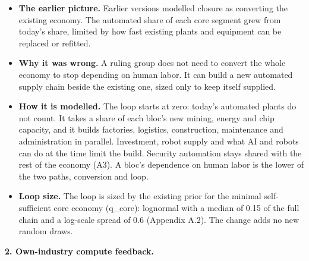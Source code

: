 \documentclass[
  10pt,
]{article}
\providecommand{\tightlist}{%
  \setlength{\itemsep}{0pt}\setlength{\parskip}{0pt}}
\begin{document}
\begin{itemize}
\tightlist
\item
  \textbf{The earlier picture.} Earlier versions modelled closure as converting the existing
  economy. The automated share of each core segment grew from today's share, limited by how fast
  existing plants and equipment can be replaced or refitted.
\item
  \textbf{Why it was wrong.} A ruling group does not need to convert the whole economy to stop
  depending on human labor. It can build a new automated supply chain beside the existing one, sized
  only to keep itself supplied.
\item
  \textbf{How it is modelled.} The loop starts at zero: today's automated plants do not count. It
  takes a share of each bloc's new mining, energy and chip capacity, and it builds factories,
  logistics, construction, maintenance and administration in parallel. Investment, robot supply and
  what AI and robots can do at the time limit the build. Security automation stays shared with the
  rest of the economy (A3). A bloc's dependence on human labor is the lower of the two paths,
  conversion and loop.
\item
  \textbf{Loop size.} The loop is sized by the existing prior for the minimal self-sufficient core
  economy (q\_core): lognormal with a median of 0.15 of the full chain and a log-scale spread of 0.6
  (Appendix A.2). The change adds no new random draws.
\end{itemize}

\textbf{2. Own-industry compute feedback.}
\end{document}
